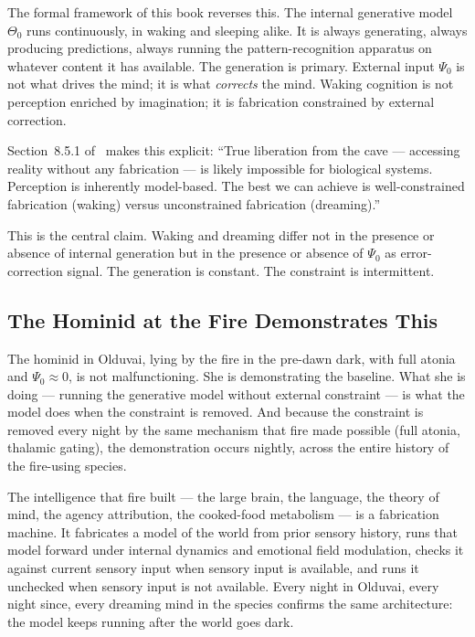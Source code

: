 The formal framework of this book reverses this. The internal generative model $\Theta_0$ runs continuously, in waking and sleeping alike. It is always generating, always producing predictions, always running the pattern-recognition apparatus on whatever content it has available. The generation is primary. External input $\Psi_0$ is not what drives the mind; it is what \textit{corrects} the mind. Waking cognition is not perception enriched by imagination; it is fabrication constrained by external correction.

Section~8.5.1 of~\cite{author_dream} makes this explicit: ``True liberation from the cave --- accessing reality without any fabrication --- is likely impossible for biological systems. Perception is inherently model-based. The best we can achieve is well-constrained fabrication (waking) versus unconstrained fabrication (dreaming).''

This is the central claim. Waking and dreaming differ not in the presence or absence of internal generation but in the presence or absence of $\Psi_0$ as error-correction signal. The generation is constant. The constraint is intermittent.

\subsection{The Hominid at the Fire Demonstrates This}

The hominid in Olduvai, lying by the fire in the pre-dawn dark, with full atonia and $\Psi_0 \approx 0$, is not malfunctioning. She is demonstrating the baseline. What she is doing --- running the generative model without external constraint --- is what the model does when the constraint is removed. And because the constraint is removed every night by the same mechanism that fire made possible (full atonia, thalamic gating), the demonstration occurs nightly, across the entire history of the fire-using species.

The intelligence that fire built --- the large brain, the language, the theory of mind, the agency attribution, the cooked-food metabolism --- is a fabrication machine. It fabricates a model of the world from prior sensory history, runs that model forward under internal dynamics and emotional field modulation, checks it against current sensory input when sensory input is available, and runs it unchecked when sensory input is not available. Every night in Olduvai, every night since, every dreaming mind in the species confirms the same architecture: the model keeps running after the world goes dark.

